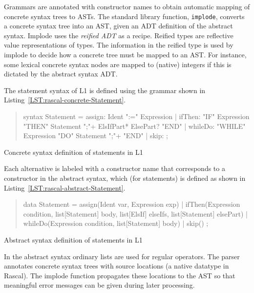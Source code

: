 Grammars are annotated with constructor names to obtain automatic
mapping of concrete syntax trees to ASTs. The \Rascal standard library function,
\texttt{implode}, converts a concrete syntax tree into an AST, given
an ADT definition of the abstract syntax. Implode uses the
\textit{reified ADT} as a recipe. Reified types are reflective value
representations of \Rascal types. The information in the reified type
is used by implode to decide how a concrete tree must be mapped to an
AST. For instance, some lexical concrete syntax nodes are mapped to
(native) integers if this is dictated by the abstract syntax ADT.

The statement syntax of \oberon L1 is defined using the grammar shown in Listing~\ref{LST:rascal-concrete-Statement}.
\begin{listing}
\begin{quote}
\begin{rascal}
syntax Statement 
  = assign: Ident ":=" Expression
  | ifThen: "IF" Expression "THEN" 
               {Statement ";"}+  ElsIfPart* ElsePart? "END"
  | whileDo: "WHILE" Expression "DO" {Statement ";"}+ "END"
  | skip: ;
\end{rascal}
\end{quote}
\caption{Concrete syntax definition of \oberon statements in L1}
\label{LST:rascal-concrete-Statement}
\end{listing}
Each alternative is labeled with a constructor name that corresponds
to a constructor in the abstract syntax, which (for statements) is
defined as shown in Listing~\ref{LST:rascal-abstract-Statement}.
\begin{listing}
\begin{quote}
\begin{rascal}
data Statement 
  = assign(Ident var, Expression exp)
  | ifThen(Expression condition, list[Statement] body, 
       list[ElsIf] elseIfs, list[Statement] elsePart)
  | whileDo(Expression condition, list[Statement] body)
  | skip()
  ;
\end{rascal}
\end{quote}
\caption{Abstract syntax definition of \oberon statements in L1}
\label{LST:rascal-abstract-Statement}
\end{listing}
In the abstract syntax ordinary \Rascal lists are used for regular
operators.  The \Rascal parser annotates concrete syntax trees with source
locations (a native datatype in Rascal). The implode function propagates these
locations to the AST so that meaningful error messages can be given
during later processing.


